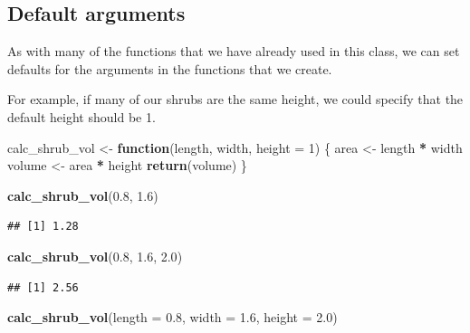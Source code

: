 \documentclass[
]{article}
\newenvironment{Shaded}{\begin{snugshade}}{\end{snugshade}}
\newcommand{\AttributeTok}[1]{\textcolor[rgb]{0.13,0.29,0.53}{#1}}
\newcommand{\ControlFlowTok}[1]{\textcolor[rgb]{0.13,0.29,0.53}{\textbf{#1}}}
\newcommand{\DecValTok}[1]{\textcolor[rgb]{0.00,0.00,0.81}{#1}}
\newcommand{\FloatTok}[1]{\textcolor[rgb]{0.00,0.00,0.81}{#1}}
\newcommand{\FunctionTok}[1]{\textcolor[rgb]{0.13,0.29,0.53}{\textbf{#1}}}
\newcommand{\NormalTok}[1]{#1}
\newcommand{\OtherTok}[1]{\textcolor[rgb]{0.56,0.35,0.01}{#1}}
\newcommand{\SpecialCharTok}[1]{\textcolor[rgb]{0.81,0.36,0.00}{\textbf{#1}}}
\begin{document}
\subsection{Default arguments}\label{default-arguments}

As with many of the functions that we have already used in this class,
we can set defaults for the arguments in the functions that we create.

For example, if many of our shrubs are the same height, we could specify
that the default height should be 1.

\begin{Shaded}
\begin{Highlighting}[]
\NormalTok{calc\_shrub\_vol }\OtherTok{\textless{}{-}} \ControlFlowTok{function}\NormalTok{(length, width, }\AttributeTok{height =} \DecValTok{1}\NormalTok{) \{}
\NormalTok{  area }\OtherTok{\textless{}{-}}\NormalTok{ length }\SpecialCharTok{*}\NormalTok{ width}
\NormalTok{  volume }\OtherTok{\textless{}{-}}\NormalTok{ area }\SpecialCharTok{*}\NormalTok{ height}
  \FunctionTok{return}\NormalTok{(volume)}
\NormalTok{\}}

\FunctionTok{calc\_shrub\_vol}\NormalTok{(}\FloatTok{0.8}\NormalTok{, }\FloatTok{1.6}\NormalTok{)}
\end{Highlighting}
\end{Shaded}

\begin{verbatim}
## [1] 1.28
\end{verbatim}

\begin{Shaded}
\begin{Highlighting}[]
\FunctionTok{calc\_shrub\_vol}\NormalTok{(}\FloatTok{0.8}\NormalTok{, }\FloatTok{1.6}\NormalTok{, }\FloatTok{2.0}\NormalTok{)}
\end{Highlighting}
\end{Shaded}

\begin{verbatim}
## [1] 2.56
\end{verbatim}

\begin{Shaded}
\begin{Highlighting}[]
\FunctionTok{calc\_shrub\_vol}\NormalTok{(}\AttributeTok{length =} \FloatTok{0.8}\NormalTok{, }\AttributeTok{width =} \FloatTok{1.6}\NormalTok{, }\AttributeTok{height =} \FloatTok{2.0}\NormalTok{)}
\end{Highlighting}
\end{Shaded}
\end{document}
